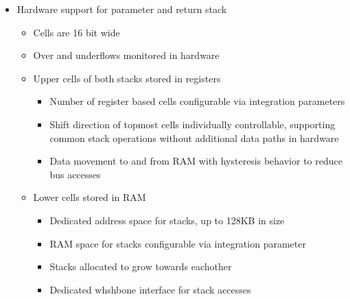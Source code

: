 \begin{itemize}






  
\item Hardware support for parameter and return stack 
  \begin{itemize}
  \item Cells are 16 bit wide
  \item Over and underflows monitored in hardware
  \item Upper cells of both stacks stored in registers
    \begin{itemize}
    \item Number of register based cells configurable via integration parameters
    \item Shift direction of topmost cells individually controllable, supporting
      common stack operations without additional data paths in hardware
    \item Data movement to and from RAM with hysteresis behavior to reduce bus accesses
    \end{itemize}
  \item Lower cells stored in RAM
    \begin{itemize}
    \item Dedicated address space for stacks, up to 128KB in size
    \item RAM space for stacks configurable via integration parameter
    \item Stacks allocated to grow towards eachother
    \item Dedicated whshbone interface for stack accesses
    \end{itemize}
  \end{itemize}
  






  
  
\end{itemize}

